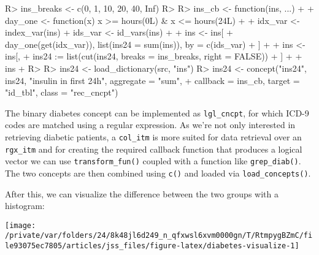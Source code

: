 \documentclass[
  notitle]{jss}
\begin{document}
\begin{CodeChunk}
\begin{CodeInput}
R> ins_breaks <- c(0, 1, 10, 20, 40, Inf)
R> 
R> ins_cb <- function(ins, ...) {
+ 
+   day_one <- function(x) x >= hours(0L) & x <= hours(24L)
+ 
+   idx_var <- index_var(ins)
+   ids_var <- id_vars(ins)
+ 
+   ins <- ins[
+     day_one(get(idx_var)), list(ins24 = sum(ins)), by = c(ids_var)
+   ]
+ 
+   ins <- ins[,
+     ins24 := list(cut(ins24, breaks = ins_breaks, right = FALSE))
+   ]
+ 
+   ins
+ }
R> 
R> ins24 <- load_dictionary(src, "ins")
R> ins24 <- concept("ins24", ins24, "insulin in first 24h", aggregate = "sum",
+                  callback = ins_cb, target = "id_tbl", class = "rec_cncpt")
\end{CodeInput}
\end{CodeChunk}

The binary diabetes concept can be implemented as \texttt{lgl\_cncpt},
for which ICD-9 codes are matched using a regular expression. As we're
not only interested in retrieving diabetic patients, a \texttt{col\_itm}
is more suited for data retrieval over an \texttt{rgx\_itm} and for
creating the required callback function that produces a logical vector
we can use \texttt{transform\_fun()} coupled with a function like
\texttt{grep\_diab()}. The two concepts are then combined using
\texttt{c()} and loaded via \texttt{load\_concepts()}.

\begin{CodeChunk}
\begin{CodeInput}
R> grep_diab <- function(x) grepl("^250\\.?[0-9]{2}$", x)
R> 
R> diab  <- item(src, table = "diagnoses_icd",
+               callback = transform_fun(grep_diab), class = "col_itm")
R> diab  <- concept("diab", diab, "diabetes", target = "id_tbl",
+                  class = "lgl_cncpt")
R> 
R> dat <- load_concepts(c(ins24, diab), id_type = "icustay", verbose = FALSE)
R> dat <- replace_na(dat, "[0,1)", vars = "ins24")
R> dat
\end{CodeInput}
\end{CodeChunk}

After this, we can visualize the difference between the two groups with
a histogram:

\begin{CodeChunk}


\begin{center}\texttt{[image: /private/var/folders/24/8k48jl6d249\_n\_qfxwsl6xvm0000gn/T/RtmpygBZmC/file93075ec7805/articles/jss\_files/figure-latex/diabetes-visualize-1]} \end{center}

\end{CodeChunk}
\end{document}
